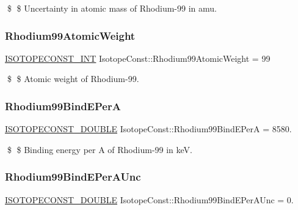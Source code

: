 \$ \$ Uncertainty in atomic mass of Rhodium-\/99 in amu. \mbox{\label{group___isotope_const-_rhodium-_rh99_ga8e841c59837276b5a368868173d6310b}} 
\subsubsection{\texorpdfstring{Rhodium99\+Atomic\+Weight}{Rhodium99AtomicWeight}}
{\footnotesize\ttfamily \mbox{\hyperlink{group___isotope_const-_macros_ga5f18360b3e99483a35c32d789e62621c}{I\+S\+O\+T\+O\+P\+E\+C\+O\+N\+S\+T\+\_\+\+I\+NT}} Isotope\+Const\+::\+Rhodium99\+Atomic\+Weight = 99}

\$ \$ Atomic weight of Rhodium-\/99. \mbox{\label{group___isotope_const-_rhodium-_rh99_ga0d032785185e4819ffc9bd03a9446163}} 
\subsubsection{\texorpdfstring{Rhodium99\+Bind\+E\+PerA}{Rhodium99BindEPerA}}
{\footnotesize\ttfamily \mbox{\hyperlink{group___isotope_const-_macros_ga8f45a7272ce02c0b4c65c44636ed719a}{I\+S\+O\+T\+O\+P\+E\+C\+O\+N\+S\+T\+\_\+\+D\+O\+U\+B\+LE}} Isotope\+Const\+::\+Rhodium99\+Bind\+E\+PerA = 8580.}

\$ \$ Binding energy per A of Rhodium-\/99 in keV. \mbox{\label{group___isotope_const-_rhodium-_rh99_gaa27eeaa5605e406a9bccbafeb2d09dc7}} 
\subsubsection{\texorpdfstring{Rhodium99\+Bind\+E\+Per\+A\+Unc}{Rhodium99BindEPerAUnc}}
{\footnotesize\ttfamily \mbox{\hyperlink{group___isotope_const-_macros_ga8f45a7272ce02c0b4c65c44636ed719a}{I\+S\+O\+T\+O\+P\+E\+C\+O\+N\+S\+T\+\_\+\+D\+O\+U\+B\+LE}} Isotope\+Const\+::\+Rhodium99\+Bind\+E\+Per\+A\+Unc = 0.}

